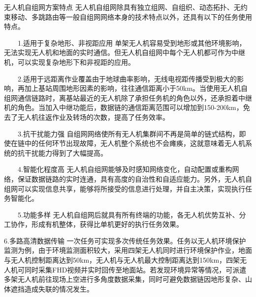 \documentclass{article}
\begin{document}
无人机自组网方案特点 无人机自组网除具有独立组网、自组织、动态拓扑、无约束移动、多跳路由等一般自组网网络本身的技术特点以外，还具有以下的任务使用特点。\par
　　1.适用于复杂地形、非视距应用 单架无人机容易受到地形或其他环境影响，无法实现无人机和地面的实时通信。但无人机自组网中每个无人机都可作为中继机，可以实现复杂地形下和非视距的应用。\par
　　2.适用于远距离作业覆盖由于地球曲率影响，无线电视距传播受到极大的影响，再加上基站周围地形因素的影响，往往通信距离小于50km。当使用无人机自组网通信链路时，离基站最近的无人机除了承担任务机的角色以外，还承担着中继机的角色。当加入中继功能后，数据链的通信距离范围可以增加到150-200km，免去了无人机往返作业及转场的次数，提高了任务效率。\par
　　3.抗干扰能力强 自组网网络使所有无人机集群间不再是简单的链式结构，即使在链中的任何环节出现故障，无人机整个系统也不会瘫痪，这就意味着无人机系统的抗干扰能力得到了大幅提高。\par
　　4.智能化程度高 无人机自组网能够及时感知网络变化，自动配置或重构网络，保证数据链路的实时连通，具有高度的自治性和自适应能力。另外，无人机自组网可以实现信息共享，能够将所接受的信息进行处理，并自主决策，实现执行任务智能化。\par
　　5.功能多样 无人机自组网后就具有所有终端的功能，各无人机优势互补、分工协作，形成有机整体，获得比单机更好的执行任务效果。\par
    6.多路高清数据传输 一次任务可实现多次传统任务效果。任务以无人机环境保护监测为例，由于环境监测面积较大，采用四架无人机同时进行环境保护作业，地面与无人机控制距离达到50km，无人机与无人机最大控制距离达到150km，四架无人机可同时采集FHD视频并实时回传至地面站。若发现环境异常等情况，可派遣多架无人机前往现场上空进行多角度数据采集，同时可避免数据链因地形复杂、山体遮挡造成失联的情况发生。　\par
\end{document}
